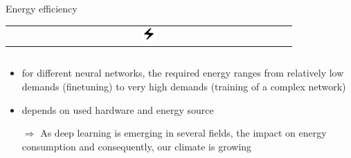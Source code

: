 \documentclass[compress,aspectratio=169]{beamer}
\begin{document}
\begin{frame}{Energy efficiency 
              \begin{tabular}{@{}c@{}}
                  \includegraphics[width=0.05\textwidth]{assets/electric_bolt_FILL0_wght400_GRAD0_opsz48}
              \end{tabular}
              }



    \begin{columns}
        
        \begin{column}{0.6\textwidth}
            \begin{itemize}
                \item for different neural networks, the required energy ranges from relatively low demands (finetuning) to very high demands (training of a complex network)
                \item depends on used hardware and energy source
                \item[$\Rightarrow$] As deep learning is emerging in several fields, the impact on energy consumption and consequently, our climate is growing
            \end{itemize}
        \end{column}


\end{columns}
\end{frame}
\end{document}
